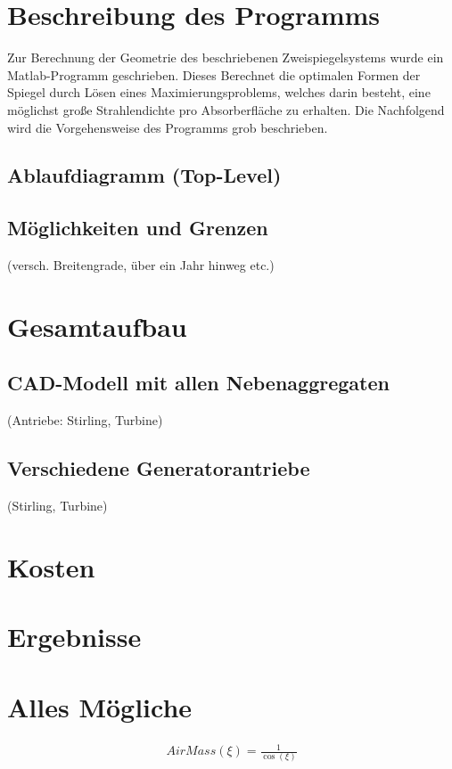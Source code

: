 \documentclass[fontsize=10pt,paper=a4,bibliography=totoc]{scrartcl}
\newcommand{\maxim}[1]{{ \color{blue} #1}}
\begin{document}
\section{Beschreibung des Programms}
\maxim{
Zur Berechnung der Geometrie des beschriebenen Zweispiegelsystems wurde ein Matlab-Programm geschrieben. Dieses Berechnet die optimalen Formen der Spiegel durch Lösen eines Maximierungsproblems, welches darin besteht, eine möglichst große Strahlendichte pro Absorberfläche zu erhalten. Die 
Nachfolgend wird die Vorgehensweise des Programms grob beschrieben.
}
\subsection{Ablaufdiagramm (Top-Level)}
\maxim{

}
\subsection{Möglichkeiten und Grenzen}
 (versch. Breitengrade, über ein Jahr hinweg etc.)
\section{Gesamtaufbau}
\subsection{CAD-Modell mit allen Nebenaggregaten}
 (Antriebe: Stirling, Turbine)
\subsection{Verschiedene Generatorantriebe}
 (Stirling, Turbine)
\section{Kosten}
\section{Ergebnisse}


\section{Alles Mögliche}

\begin{align*}
	AirMass(\xi)=\frac{1}{\cos(\xi)}
\end{align*}
\end{document}
